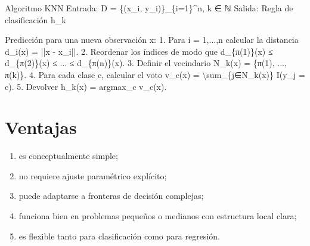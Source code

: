 \documentclass[
  spanish,
  10.5pt,
  letterpaper,
  DIV=11,
  numbers=noendperiod,
  oneside,
  open=any]{scrreprt}
\newenvironment{Shaded}{\begin{snugshade}}{\end{snugshade}}
\newcommand{\NormalTok}[1]{\textcolor[rgb]{0.00,0.23,0.31}{#1}}
\providecommand{\tightlist}{%
  \setlength{\itemsep}{0pt}\setlength{\parskip}{0pt}}
\theoremstyle{definition}
\theoremstyle{definition}
\theoremstyle{plain}
\theoremstyle{remark}
\begin{document}

\begin{tcolorbox}[enhanced jigsaw, arc=.35mm, bottomrule=.15mm, bottomtitle=1mm, breakable, colback=white, colbacktitle=quarto-callout-note-color!10!white, colframe=quarto-callout-note-color-frame, coltitle=black, left=2mm, leftrule=.75mm, opacityback=0, opacitybacktitle=0.6, rightrule=.15mm, title=\textcolor{quarto-callout-note-color}{\faInfo}\hspace{0.5em}{Seudocódigo matemático formal}, titlerule=0mm, toprule=.15mm, toptitle=1mm]

\begin{Shaded}
\begin{Highlighting}[numbers=left,,]
\NormalTok{Algoritmo KNN}
\NormalTok{Entrada:}
\NormalTok{  D = \{(x\_i, y\_i)\}\_\{i=1\}\^{}n, k ∈ ℕ}
\NormalTok{Salida:}
\NormalTok{  Regla de clasificación h\_k}

\NormalTok{Predicción para una nueva observación x:}
\NormalTok{1. Para i = 1,...,n calcular la distancia}
\NormalTok{      d\_i(x) = ||x {-} x\_i||.}
\NormalTok{2. Reordenar los índices de modo que}
\NormalTok{      d\_\{π(1)\}(x) ≤ d\_\{π(2)\}(x) ≤ ... ≤ d\_\{π(n)\}(x).}
\NormalTok{3. Definir el vecindario}
\NormalTok{      N\_k(x) = \{π(1), ..., π(k)\}.}
\NormalTok{4. Para cada clase c, calcular el voto}
\NormalTok{      v\_c(x) = \textbackslash{}sum\_\{j∈N\_k(x)\} I(y\_j = c).}
\NormalTok{5. Devolver}
\NormalTok{      h\_k(x) = argmax\_c v\_c(x).}
\end{Highlighting}
\end{Shaded}

\end{tcolorbox}

\section*{Ventajas}\label{ventajas}


\begin{enumerate}
\def\labelenumi{\arabic{enumi}.}
\tightlist
\item
  es conceptualmente simple;
\item
  no requiere ajuste paramétrico explícito;
\item
  puede adaptarse a fronteras de decisión complejas;
\item
  funciona bien en problemas pequeños o medianos con estructura local
  clara;
\item
  es flexible tanto para clasificación como para regresión.
\end{enumerate}
\end{document}
